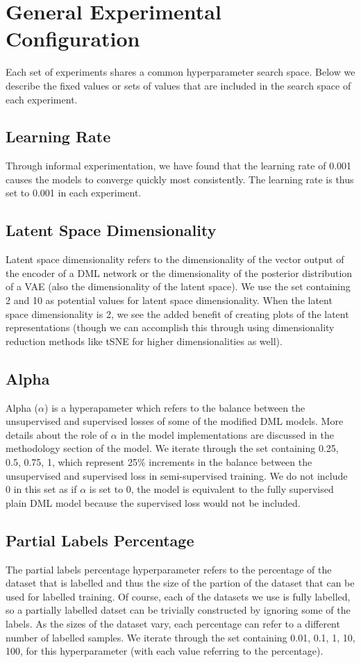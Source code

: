 \documentclass[./dissertation.tex]{subfiles}
\begin{document}
    
    
    \section{General Experimental Configuration}
    Each set of experiments shares a common hyperparameter search space. Below we describe the fixed values or sets of values that are included in the search space of each experiment. 
    \subsection{Learning Rate}
    Through informal experimentation, we have found that the learning rate of 0.001 causes the models to converge quickly most consistently. The learning rate is thus set to 0.001 in each experiment.
    \subsection{Latent Space Dimensionality}
    Latent space dimensionality refers to the dimensionality of the vector output of the encoder of a DML network or the dimensionality of the posterior distribution of a VAE (also the dimensionality of the latent space). We use the set containing 2 and 10 as potential values for latent space dimensionality. When the latent space dimensionality is 2, we see the added benefit of creating plots of the latent representations (though we can accomplish this through using dimensionality reduction methods like tSNE for higher dimensionalities as well).
    \subsection{Alpha}
    Alpha ($\alpha$) is a hyperapameter which refers to the balance between the unsupervised and supervised losses of some of the modified DML models. More details about the role of $\alpha$ in the model implementations are discussed in the methodology section of the model. We iterate through the set containing 0.25, 0.5, 0.75, 1, which represent 25\% increments in the balance between the unsupervised and supervised loss in semi-supervised training. We do not include 0 in this set as if $\alpha$ is set to 0, the model is equivalent to the fully supervised plain DML model because the supervised loss would not be included.
    \subsection{Partial Labels Percentage}
    The partial labels percentage hyperparameter refers to the percentage of the dataset that is labelled and thus the size of the partion of the dataset that can be used for labelled training. Of course, each of the datasets we use is fully labelled, so a partially labelled datset can be trivially constructed by ignoring some of the labels. As the sizes of the dataset vary, each percentage can refer to a different number of labelled samples. We iterate through the set containing 0.01, 0.1, 1, 10, 100, for this hyperparameter (with each value referring to the percentage). 
\end{document}
